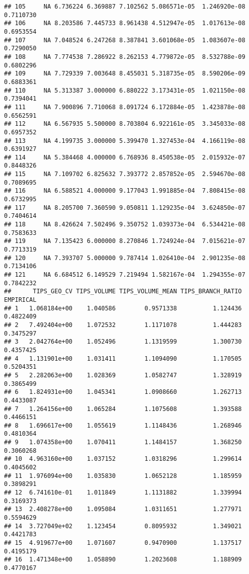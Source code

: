 \documentclass[]{article}
\begin{document}
\begin{verbatim}
## 105     NA 6.736224 6.369887 7.102562 5.086571e-05  1.246920e-08 0.7110730
## 106     NA 8.203586 7.445733 8.961438 4.512947e-05  1.017613e-08 0.6953554
## 107     NA 7.048524 6.247268 8.387841 3.601068e-05  1.083607e-08 0.7290050
## 108     NA 7.774538 7.286922 8.262153 4.779872e-05  8.532788e-09 0.6802296
## 109     NA 7.729339 7.003648 8.455031 5.318735e-05  8.590206e-09 0.6883361
## 110     NA 5.313387 3.000000 6.880222 3.173431e-05  1.021150e-08 0.7394041
## 111     NA 7.900896 7.710068 8.091724 6.172884e-05  1.423878e-08 0.6562591
## 112     NA 6.567935 5.500000 8.703804 6.922161e-05  3.345033e-08 0.6957352
## 113     NA 4.199735 3.000000 5.399470 1.327453e-04  4.166119e-08 0.6391927
## 114     NA 5.384468 4.000000 6.768936 8.450538e-05  2.015932e-07 0.8448326
## 115     NA 7.109702 6.825632 7.393772 2.857852e-05  2.594670e-08 0.7089695
## 116     NA 6.588521 4.000000 9.177043 1.991885e-04  7.808415e-08 0.6732995
## 117     NA 8.205700 7.360590 9.050811 1.129235e-04  3.624850e-07 0.7404614
## 118     NA 8.426624 7.502496 9.350752 1.039373e-04  6.534421e-08 0.7583633
## 119     NA 7.135423 6.000000 8.270846 1.724924e-04  7.015621e-07 0.7713319
## 120     NA 7.393707 5.000000 9.787414 1.026410e-04  2.901235e-08 0.7134106
## 121     NA 6.684512 6.149529 7.219494 1.582167e-04  1.294355e-07 0.7842232
##      TIPS_GEO_CV TIPS_VOLUME TIPS_VOLUME_MEAN TIPS_BRANCH_RATIO EMPIRICAL
## 1   1.068184e+00    1.040586        0.9571338          1.124436 0.4822409
## 2   7.492404e+00    1.072532        1.1171078          1.444283 0.3475297
## 3   2.042764e+00    1.052496        1.1319599          1.300730 0.4357425
## 4   1.131901e+00    1.031411        1.1094090          1.170505 0.5204351
## 5   2.282063e+00    1.028369        1.0582747          1.328919 0.3865499
## 6   1.824931e+00    1.045341        1.0908660          1.262713 0.4433087
## 7   1.264156e+00    1.065284        1.1075608          1.393588 0.4466151
## 8   1.696617e+00    1.055619        1.1148436          1.268946 0.4810364
## 9   1.074358e+00    1.070411        1.1484157          1.368250 0.3060268
## 10  4.963160e+00    1.037152        1.0318296          1.299614 0.4045602
## 11  1.976094e+00    1.035830        1.0652128          1.185959 0.3898291
## 12  6.741610e-01    1.011849        1.1131882          1.339994 0.3169373
## 13  2.408278e+00    1.095084        1.0311651          1.277971 0.5594629
## 14  3.727049e+02    1.123454        0.8095932          1.349021 0.4421783
## 15  4.919677e+00    1.071607        0.9470900          1.137517 0.4195179
## 16  1.471348e+00    1.058890        1.2023608          1.188909 0.4770167

\end{verbatim}
\end{document}
